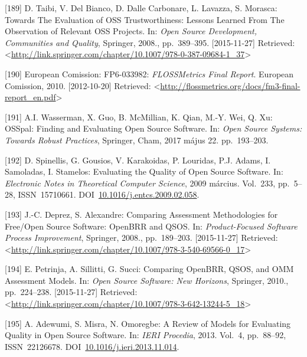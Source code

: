 \documentclass[12pt,magyar,a4paper,oneside]{scrreprt}
\begin{document}
\leavevmode\hypertarget{ref-taibi_towards_2008}{}%
{[}189{]} D. Taibi, V. Del Bianco, D. Dalle Carbonare, L. Lavazza, S.
Morasca: Towards The Evaluation of OSS Trustworthiness: Lessons Learned
From The Observation of Relevant OSS Projects. In: \emph{Open Source
Development, Communities and Quality}, Springer, 2008., pp.~389--395.
{[}2015-11-27{]} Retrieved:
\textless{}\url{http://link.springer.com/chapter/10.1007/978-0-387-09684-1_37}\textgreater{}

\leavevmode\hypertarget{ref-european_comission_flossmetrics_2010}{}%
{[}190{]} European Comission: FP6-033982: \emph{FLOSSMetrics Final
Report}. European Comission, 2010. {[}2012-10-20{]} Retrieved:
\textless{}\url{http://flossmetrics.org/docs/fm3-final-report_en.pdf}\textgreater{}

\leavevmode\hypertarget{ref-wasserman_osspal_2017}{}%
{[}191{]} A.I. Wasserman, X. Guo, B. McMillian, K. Qian, M.-Y. Wei, Q.
Xu: OSSpal: Finding and Evaluating Open Source Software. In: \emph{Open
Source Systems: Towards Robust Practices}, Springer, Cham, 2017 május
22. pp.~193--203.

\leavevmode\hypertarget{ref-spinellis_evaluating_2009}{}%
{[}192{]} D. Spinellis, G. Gousios, V. Karakoidas, P. Louridas, P.J.
Adams, I. Samoladas, I. Stamelos: Evaluating the Quality of Open Source
Software. In: \emph{Electronic Notes in Theoretical Computer Science},
2009 március. Vol.~233, pp.~5--28, ISSN~15710661.
DOI~\href{https://doi.org/10.1016/j.entcs.2009.02.058}{10.1016/j.entcs.2009.02.058}.

\leavevmode\hypertarget{ref-deprez_comparing_2008}{}%
{[}193{]} J.-C. Deprez, S. Alexandre: Comparing Assessment Methodologies
for Free/Open Source Software: OpenBRR and QSOS. In:
\emph{Product-Focused Software Process Improvement}, Springer, 2008.,
pp.~189--203. {[}2015-11-27{]} Retrieved:
\textless{}\url{http://link.springer.com/chapter/10.1007/978-3-540-69566-0_17}\textgreater{}

\leavevmode\hypertarget{ref-petrinja_comparing_2010}{}%
{[}194{]} E. Petrinja, A. Sillitti, G. Succi: Comparing OpenBRR, QSOS,
and OMM Assessment Models. In: \emph{Open Source Software: New
Horizons}, Springer, 2010., pp.~224--238. {[}2015-11-27{]} Retrieved:
\textless{}\url{http://link.springer.com/chapter/10.1007/978-3-642-13244-5_18}\textgreater{}

\leavevmode\hypertarget{ref-adewumi_review_2013}{}%
{[}195{]} A. Adewumi, S. Misra, N. Omoregbe: A Review of Models for
Evaluating Quality in Open Source Software. In: \emph{IERI Procedia},
2013. Vol.~4, pp.~88--92, ISSN~22126678.
DOI~\href{https://doi.org/10.1016/j.ieri.2013.11.014}{10.1016/j.ieri.2013.11.014}.
\end{document}
